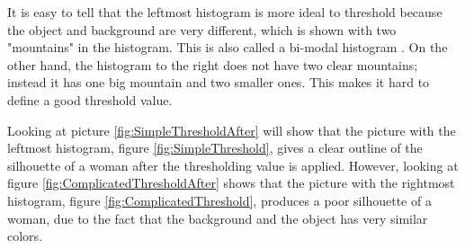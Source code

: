 It is easy to tell that the leftmost histogram is more ideal to threshold because the object and background are very different, which is shown with two "mountains" in the histogram. This is also called a bi-modal histogram \citep{ip_book}. On the other hand, the histogram to the right does not have two clear mountains; instead it has one big mountain and two smaller ones. This makes it hard to define a good threshold value.

Looking at picture \ref{fig:SimpleThresholdAfter} will show that the picture with the leftmost histogram, figure \ref{fig:SimpleThreshold}, gives a clear outline of the silhouette of a woman after the thresholding value is applied. However, looking at figure \ref{fig:ComplicatedThresholdAfter} shows that the picture with the rightmost histogram, figure \ref{fig:ComplicatedThreshold}, produces a poor silhouette of a woman, due to the fact that the background and the object has very similar colors. 

